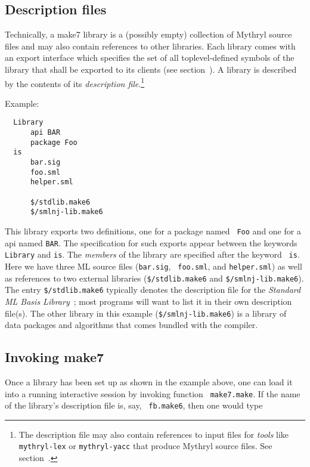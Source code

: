 \subsection{Description files}

Technically, a make7 library is a (possibly empty) collection of Mythryl
source files and may also contain references to other libraries.  Each
library comes with an export interface which specifies the set of all
toplevel-defined symbols of the library that shall be exported to its
clients (see section~).  A library is
described by the contents of its {\em description file}.\footnote{The
description file may also contain references to input files for {\em
tools} like {\tt mythryl-lex} or {\tt mythryl-yacc} that produce Mythryl source
files.  See section~.}

\noindent Example:

\begin{verbatim}
  Library
      api BAR
      package Foo
  is
      bar.sig
      foo.sml
      helper.sml

      $/stdlib.make6
      $/smlnj-lib.make6
\end{verbatim}

This library exports two definitions, one for a package named {\tt
Foo} and one for a api named {\tt BAR}.  The specification for
such exports appear between the keywords {\tt Library} and {\tt is}.
The {\em members} of the library are specified after the keyword {\tt
is}.  Here we have three ML source files ({\tt bar.sig}, {\tt
foo.sml}, and {\tt helper.sml}) as well as references to two external
libraries ({\tt \$/stdlib.make6} and {\tt \$/smlnj-lib.make6}).  The entry
{\tt \$/stdlib.make6} typically denotes the description file for the {\it
Standard ML Basis Library}~\cite{reppy99:basis}; most programs will
want to list it in their own description file(s).  The other library
in this example ({\tt \$/smlnj-lib.make6}) is a library of data
packages and algorithms that comes bundled with the compiler.

\subsection{Invoking make7}

Once a library has been set up as shown in the example above, one can
load it into a running interactive session by invoking function {\tt
make7.make}.  If the name of the library's description file is, say, {\tt
fb.make6}, then one would type

